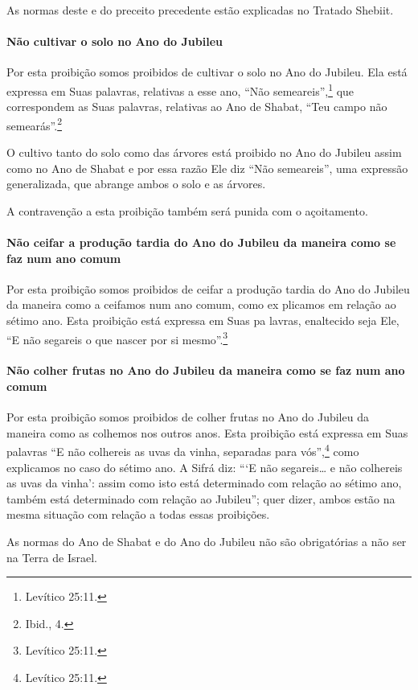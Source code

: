As normas deste e do preceito precedente estão explicadas no Tratado Shebiit.

\paragraph{Não cultivar o solo no Ano do Jubileu}

Por esta proibição somos proibidos de cultivar o solo no Ano do Jubileu.
Ela está expressa em Suas palavras, relativas a esse ano, ``Não
semeareis'',\footnote{Levítico 25:11.} que correspondem as Suas palavras,
relativas ao Ano de Shabat, ``Teu campo não semearás''.\footnote{Ibid., 4.}

O cultivo tanto do solo como das árvores está proibido no Ano do Jubileu
assim como no Ano de Shabat e por essa razão Ele diz ``Não semeareis'',
uma expressão generalizada, que abrange ambos o solo e as árvores.

A contravenção a esta proibição também será punida com o açoitamento.

\paragraph{Não ceifar a produção tardia do Ano do Jubileu da maneira como se
faz num ano comum}

Por esta proibição somos proibidos de ceifar a produção tardia do Ano do
Jubileu da maneira como a ceifamos num ano comum, como ex plicamos em
relação ao sétimo ano. Esta proibição está expressa em Suas pa lavras,
enaltecido seja Ele, ``E não segareis o que nascer por si mesmo''.\footnote{Levítico 25:11.}

\paragraph{Não colher frutas no Ano do Jubileu da maneira como se faz num ano comum}

Por esta proibição somos proibidos de colher frutas no Ano do Jubileu da
maneira como as colhemos nos outros anos. Esta proibição está expressa
em Suas palavras ``E não colhereis as uvas da vinha, separadas para
vós'',\footnote{Levítico 25:11.} como explicamos no caso do sétimo ano. A Sifrá
diz: ```E não segareis\ldots{} e não colhereis as uvas da vinha': assim como
isto está determinado com relação ao sétimo ano, também está determinado
com relação ao Jubileu''; quer dizer, ambos estão na mesma situação com
relação a todas essas proibições.

As normas do Ano de Shabat e do Ano do Jubileu não são obrigatórias a
não ser na Terra de Israel.

